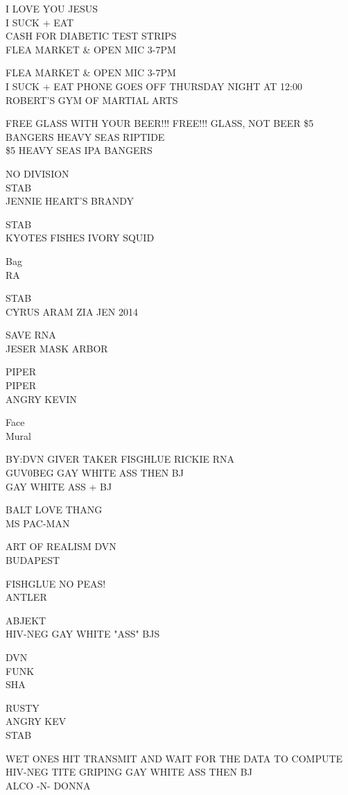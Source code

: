 \documentclass[10pt,letterpaper]{article}
\begin{document}
I LOVE YOU JESUS\\
I SUCK + EAT\\
CASH FOR DIABETIC TEST STRIPS\\
FLEA MARKET \& OPEN MIC 3{-}7PM

FLEA MARKET \& OPEN MIC 3{-}7PM\\
I SUCK + EAT PHONE GOES OFF THURSDAY NIGHT AT 12:00\\
ROBERT'S GYM OF MARTIAL ARTS

FREE GLASS WITH YOUR BEER!!! FREE!!! GLASS, NOT BEER \$5 BANGERS HEAVY SEAS RIPTIDE\\
\$5 HEAVY SEAS IPA BANGERS

NO DIVISION\\
STAB\\
JENNIE HEART'S BRANDY

STAB\\
KYOTES FISHES IVORY SQUID

Bag\\
RA

STAB\\
CYRUS ARAM ZIA JEN 2014

SAVE RNA\\
JESER MASK ARBOR

PIPER\\
PIPER\\
ANGRY KEVIN

Face\\
Mural

BY:DVN GIVER TAKER FISGHLUE RICKIE RNA\\
GUV0BEG GAY WHITE ASS THEN BJ\\
GAY WHITE ASS + BJ

BALT LOVE THANG\\
MS PAC{-}MAN

ART OF REALISM DVN\\
BUDAPEST

FISHGLUE NO PEAS!\\
ANTLER

ABJEKT\\
HIV{-}NEG GAY WHITE "ASS" BJS

DVN\\
FUNK\\
SHA

RUSTY\\
ANGRY KEV\\
STAB

WET ONES HIT TRANSMIT AND WAIT FOR THE DATA TO COMPUTE\\
HIV{-}NEG TITE GRIPING GAY WHITE ASS THEN BJ\\
ALCO {-}N{-} DONNA
\end{document}
